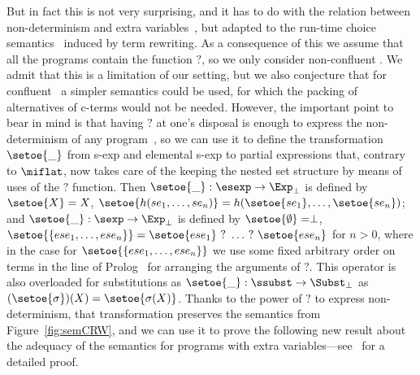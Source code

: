 But in fact this is not very surprising, and it has to do with the relation between non-determinism and
extra variables~\cite{AntoyH06Extra}, but adapted to the run-time choice semantics~\cite{hussmann93,rodH08}
induced by term rewriting.  As a consequence of this we assume that all the programs contain the function $?$, so we only consider 
non-confluent \trss. We admit that this is a limitation of our setting, but we also conjecture that 
for confluent \trss\ a simpler semantics could be used, for which the packing of alternatives of c-terms
would not be needed. However, the important point to bear in mind is that
having $?$ at one's disposal is enough to express the non-determinism of any program~\cite{Han05TR}, so
we can use it to define the transformation $\setoe{\_}$ from s-exp and elemental s-exp to partial 
expressions that, contrary to $\miflat$, now takes care of the keeping the nested set structure by means 
of uses of the $?$ function. Then $\setoe{\_} : \esexp \rightarrow \Exp_\perp$ is defined by 
$\setoe{X} = X$, $\setoe{h(se_1, \ldots, se_n)} = h(\setoe{se_1}, \ldots, \setoe{se_n})$; and 
$\setoe{\_} : \sexp \rightarrow \Exp_\perp$ is defined by $\setoe{\emptyset} = \perp$, 
$\setoe{\{ese_1, \ldots, ese_n\}} = \setoe{ese_1}~?~\ldots~?~\setoe{ese_n}$ for $n > 0$, where in the 
case for $\setoe{\{ese_1, \ldots, ese_n\}}$ we use some fixed arbitrary order on terms in the line of 
Prolog~\cite{SterlingShapiro86} for arranging the arguments of $?$. This operator is also overloaded 
for substitutions as $\setoe{\_} : \ssubst \rightarrow \Subst_\perp$ as 
$(\setoe{\sigma})(X) = \setoe{\sigma(X)}$.
Thanks to the power of $?$ to express non-determinism, that transformation preserves the semantics from
Figure~\ref{fig:semCRW}, and we can use it to prove the following new result about the adequacy of the
semantics for programs with extra variables---see~\cite{generatorsProofs} for a detailed proof.

